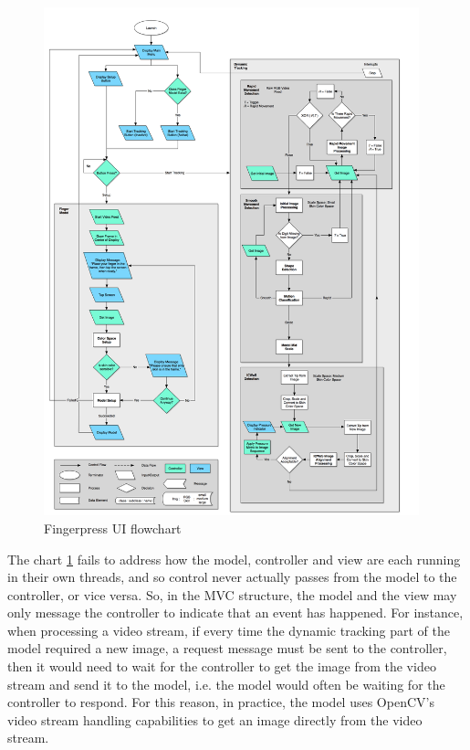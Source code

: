 \begin{figure}[h!]
  \centering
    \includegraphics[width=0.97\textwidth]{Chapter4/Figs/Fingerpress_UI.jpg}
    \caption{Fingerpress UI flowchart}\label{fig:FingerpressUI}
\end{figure}

The chart \ref{fig:FingerpressUI} fails to address how the model, controller and view are each running in their own threads, and so control never actually passes from the model to the controller, or vice versa. So, in the MVC structure, the model and the view may only message the controller to indicate that an event has happened. For instance, when processing a video stream, if every time the dynamic tracking part of the model required a new image, a request message must be sent to the controller, then it would need to wait for the controller to get the image from the video stream and send it to the model, i.e. the model would often be waiting for the controller to respond. For this reason, in practice, the model uses OpenCV's video stream handling capabilities to get an image directly from the video stream.


